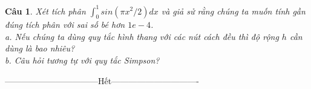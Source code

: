 \documentclass[11pt]{article}
\newtheorem{bt}{Câu}
\begin{document}
\begin{bt}
	Xét tích phân $\int_{0}^{1} sin(\pi x^2/2) dx$ và giả sử rằng chúng ta muốn tính gần đúng tích phân với sai số bé hơn $1e-4$. \\
	a. Nếu chúng ta dùng quy tắc hình thang với các nút cách đều thì độ rộng $h$ cần dùng là bao nhiêu?\\
	b. Câu hỏi tương tự với quy tắc Simpson?	
\end{bt}

\centerline{———————————Hết——————————-}
\end{document}

